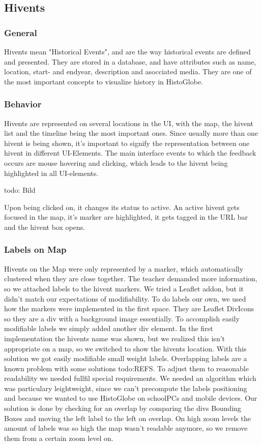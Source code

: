 \subsection{Hivents} %
\label{sec:hivents}
\subsubsection{General} %
\label{sub:general}
Hivents mean "Historical Events", and are the way historical events are defined and presented. They are stored in a database, and have attributes such as name, location, start- and endyear, description and asocciated media.
They are one of the most important concepts to visualize history in HistoGlobe.

\subsubsection{Behavior} %
\label{sub:behaviour}
Hivents are represented on several locations in the UI, with the map, the hivent list and the timeline being the most important ones.
Since usually more than one hivent is being shown, it's important to signify the representation between one hivent in different UI-Elements.
The main interface events to which the feedback occurs are mouse hovering and clicking, which leads to the hivent being highlighted in all UI-elements.

todo: Bild

Upon being clicked on, it changes its status to active. An active hivent gets focused in the map, it's marker are highlighted, it gets tagged in the URL bar and the hivent box opens.

\subsubsection{Labels on Map}
Hivents on the Map were only represented by a marker, which automatically clustered when they are close together.
The teacher demanded more information, so we attached labels to the hivent markers.
We tried a Leaflet addon, but it didn't match our expectations of modifiability.
To do labels our own, we used how the markers were implemented in the first space. They are Leaflet DivIcons so they are a div with a background image essentially. To accomplish easily modifiable labels we simply added another div element.
In the first implementation the hivents name was shown, but we realized this isn't appropriate on a map, so we switched to show the hivents location. With this solution we got easily modifiable small weight labels.
Overlapping labels are a known problem with some solutions todo:REFS.
To adjust them to reasonable readability we needed fullfil special requirements.
We needed an algorithm which was particulary leightweight, since we can't precompute the labels positioning and because we wanted to use HistoGlobe on schoolPCs and mobile devices.
Our solution is done by checking for an overlap by comparing the divs Bounding Boxes and moving the left label to the left on overlap.
On high zoom levels the amount of labels was so high the map wasn't readable anymore, so we remove them from a certain zoom level on.


